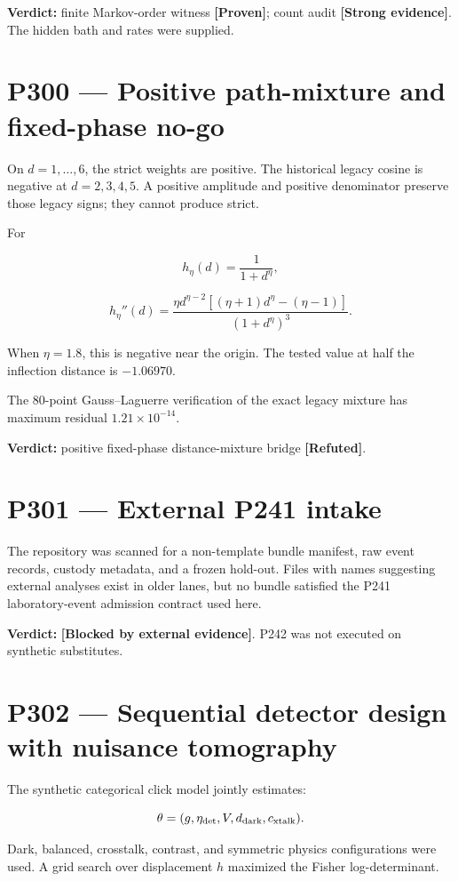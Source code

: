 \documentclass[11pt,a4paper,openany]{report}
\newcommand{\statusProven}{\textcolor{fingreen}{[Proven]}}
\newcommand{\statusStrong}{\textcolor{finblue}{[Strong evidence]}}
\newcommand{\statusRefuted}{\textcolor{finred}{[Refuted]}}
\begin{document}
\textbf{Verdict:} finite Markov-order witness \textbf{\statusProven{}}; count audit \textbf{\statusStrong{}}. The hidden bath and rates were supplied.

\section{P300 --- Positive path-mixture and fixed-phase no-go}

On \(d=1,\ldots,6\), the strict weights are positive. The historical legacy cosine is negative at \(d=2,3,4,5\). A positive amplitude and positive denominator preserve those legacy signs; they cannot produce strict.

For

\[
h_\eta(d)=\frac{1}{1+d^\eta},
\]

\[
h_\eta''(d)
=
\frac{\eta d^{\eta-2}
\left[(\eta+1)d^\eta-(\eta-1)\right]}
{(1+d^\eta)^3}.
\]

When \(\eta=1.8\), this is negative near the origin. The tested value at half the inflection distance is \(-1.06970\).

The 80-point Gauss--Laguerre verification of the exact legacy mixture has maximum residual \(1.21\times10^{-14}\).

\textbf{Verdict:} positive fixed-phase distance-mixture bridge \textbf{\statusRefuted{}}.

\section{P301 --- External P241 intake}

The repository was scanned for a non-template bundle manifest, raw event records, custody metadata, and a frozen hold-out. Files with names suggesting external analyses exist in older lanes, but no bundle satisfied the P241 laboratory-event admission contract used here.

\textbf{Verdict:} \textbf{[Blocked by external evidence]}. P242 was not executed on synthetic substitutes.

\section{P302 --- Sequential detector design with nuisance tomography}

The synthetic categorical click model jointly estimates:

\[
\theta=(g,\eta_{\rm det},V,d_{\rm dark},c_{\rm xtalk}).
\]

Dark, balanced, crosstalk, contrast, and symmetric physics configurations were used. A grid search over displacement \(h\) maximized the Fisher log-determinant.
\end{document}
